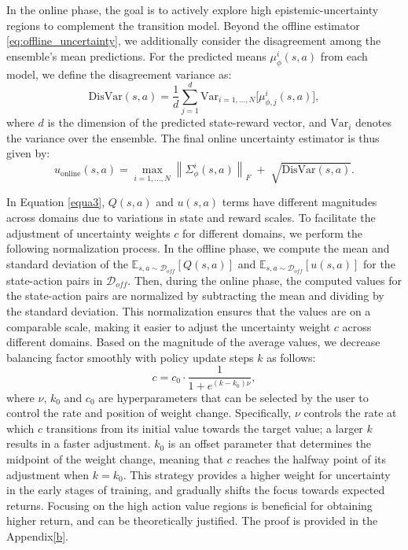 \documentclass[conference]{IEEEtran}
\begin{document}
In the online phase, the goal is to actively explore high epistemic-uncertainty regions to complement the transition model.
Beyond the offline estimator \eqref{eq:offline_uncertainty}, we additionally consider the disagreement among the ensemble's mean predictions.
For the predicted means \(\mu^i_\phi(s,a)\) from each model, we define the disagreement variance as:
%
\begin{equation}
\mathrm{DisVar}(s,a) =
\frac{1}{d}\sum_{j=1}^d \mathrm{Var}_{i=1,\dots,N}\!\big[\mu^i_{\phi,j}(s,a)\big],
\end{equation}
%
where \(d\) is the dimension of the predicted state-reward vector, and \(\mathrm{Var}_i\) denotes the variance over the ensemble.
The final online uncertainty estimator is thus given by:
%
\begin{equation}
u_{\text{online}}(s,a) =
\max_{i=1,\dots,N} \left\| \Sigma^i_\phi(s, a) \right\|_F
\; + \;
\sqrt{\mathrm{DisVar}(s,a)}.
\label{eq:online_uncertainty}
\end{equation}

In Equation \ref{equa3}, $Q(s,a)$ and $u(s, a)$ terms have different magnitudes across domains due to variations in state and reward scales. To facilitate the adjustment of uncertainty weights \( c \) for different domains, we perform the following normalization process. In the offline phase, we compute the mean and standard deviation of the $\mathbb{E}_{s, a\sim \mathcal{D}_{off}}[Q(s, a)]$ and $\mathbb{E}_{s, a\sim \mathcal{D}_{off}}[u(s, a)]$ for the state-action pairs in \( \mathcal{D}_{off} \). Then, during the online phase, the  computed values for the state-action pairs are normalized by subtracting the mean and dividing by the standard deviation. This normalization ensures that the values are on a comparable scale, making it easier to adjust the uncertainty weight \( c \) across different domains. Based on the magnitude of the average values, we decrease balancing factor smoothly with policy update steps \( k \) as follows:
\begin{equation}
\label{eqa4}
    c = c_0 \cdot \frac{1}{1 + e^{(k - k_0)\nu}},
\end{equation}
where $\nu$, $k_0$ and $c_0$ are hyperparameters that can be selected by the user to control the rate and position of weight change. Specifically, $\nu$ controls the rate at which $c$ transitions from its initial value towards the target value; a larger $k$ results in a faster adjustment. $k_0$ is an offset parameter that determines the midpoint of the weight change, meaning that $c$ reaches the halfway point of its adjustment when $k=k_0$. This strategy provides a higher weight for uncertainty in the early stages of training, and gradually shifts the focus towards expected returns. Focusing on the high action value regions is beneficial for obtaining higher return, and can be theoretically justified. The proof is provided in the Appendix\ref{b}.
\end{document}
